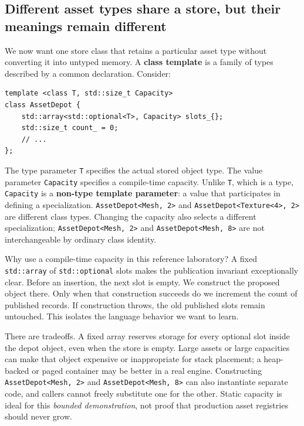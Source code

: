 \subsection{Different asset types share a store, but their meanings remain different}\label{05-engine-i-ch005-different-asset-types-share-a-store-but-their-meanings-remain-different}

We now want one store class that retains a particular asset type without converting it into untyped memory. A \textbf{class template} is a family of types described by a common declaration. Consider:

\begin{verbatim}
template <class T, std::size_t Capacity>
class AssetDepot {
    std::array<std::optional<T>, Capacity> slots_{};
    std::size_t count_ = 0;
    // ...
};
\end{verbatim}

The type parameter \texttt{T} specifies the actual stored object type. The value parameter \texttt{Capacity} specifies a compile-time capacity. Unlike \texttt{T}, which is a type, \texttt{Capacity} is a \textbf{non-type template parameter}: a value that participates in defining a specialization. \texttt{AssetDepot\textless{}Mesh,\ 2\textgreater{}} and \texttt{AssetDepot\textless{}Texture\textless{}4\textgreater{},\ 2\textgreater{}} are different class types. Changing the capacity also selects a different specialization; \texttt{AssetDepot\textless{}Mesh,\ 2\textgreater{}} and \texttt{AssetDepot\textless{}Mesh,\ 8\textgreater{}} are not interchangeable by ordinary class identity.

Why use a compile-time capacity in this reference laboratory? A fixed \texttt{std::array} of \texttt{std::optional} slots makes the publication invariant exceptionally clear. Before an insertion, the next slot is empty. We construct the proposed object there. Only when that construction succeeds do we increment the count of published records. If construction throws, the old published slots remain untouched. This isolates the language behavior we want to learn.

There are tradeoffs. A fixed array reserves storage for every optional slot inside the depot object, even when the store is empty. Large assets or large capacities can make that object expensive or inappropriate for stack placement; a heap-backed or paged container may be better in a real engine. Constructing \texttt{AssetDepot\textless{}Mesh,\ 2\textgreater{}} and \texttt{AssetDepot\textless{}Mesh,\ 8\textgreater{}} can also instantiate separate code, and callers cannot freely substitute one for the other. Static capacity is ideal for this \emph{bounded demonstration}, not proof that production asset registries should never grow.

